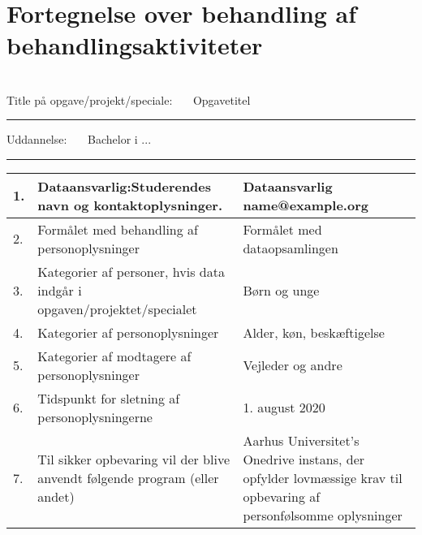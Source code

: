 \documentclass[11pt, a4paper]{article}
\makeatletter
\newcommand{\opgavetitel}{ Opgavetitel }	 		%
\newcommand{\uddannelse}{ Bachelor i ... }	 		%
\newcommand{\dataansvarligNavn}{ Dataansvarlig }	%
\newcommand{\dataansvarligMail}{ name@example.org }	%
\newcommand{\dataansvarligTelefon}{ 12345678 }	 	%
\newcommand{\formaal}{Formålet med dataopsamlingen}	%
\newcommand{\personKategorier}{Børn og unge}		%
\newcommand{\personoplys}{Alder, køn, beskæftigelse}%
\newcommand{	\modtagere}{Vejleder og andre}			%
\newcommand{\sletning}{1. august 2020}				%
\newcommand{\opbevaring}{Aarhus Universitet's Onedrive instans, der opfylder lovmæssige krav til opbevaring af personfølsomme oplysninger}%
\makeatother
\begin{document}
\pagestyle{fancy}
~
\vspace{1cm}

\section*{Fortegnelse over behandling af behandlingsaktiviteter}~\\



Title på opgave/projekt/speciale:~~~\opgavetitel
\hrule


\vspace{5mm}

Uddannelse:~~~\uddannelse
\vspace{1mm}
\hrule

\vspace{5mm}


\begin{table}[h]

\begin{tabular}{ | l p{} | p{} | }
\hline
1. & Dataansvarlig:\newline Studerendes navn og kontaktoplysninger.  			& \dataansvarligNavn \newline \dataansvarligMail \newline \dataansvarligTelefon \\ \hline  %
2. & Formålet med behandling af personoplysninger 								& \formaal     		\\ \hline
3. & Kategorier af personer, hvis data indgår i opgaven/projektet/specialet 	& \personKategorier	\\ \hline  %
4. & Kategorier af personoplysninger 											& \personoplys  		\\ \hline  %
5. & Kategorier af modtagere af personoplysninger 								& \modtagere    		\\ \hline  %
6. & Tidspunkt for sletning af personoplysningerne 								& \sletning 			\\ \hline %
7. & Til sikker opbevaring vil der blive anvendt følgende program (eller andet) 	& \opbevaring 		\\ \hline  %
\end{tabular}%

\end{table}
\end{document}

